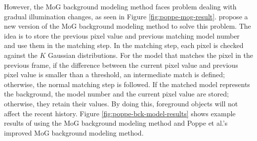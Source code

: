 However, the MoG background modeling method faces problem dealing
with gradual illumination changes, as seen in
Figure \ref{fig:poppe-mog-result}. 
propose a new version of the MoG background modeling method to solve
this problem. The idea is to store the previous pixel value and
previous matching model number and use them in the matching step. In
the matching step, each pixel is checked against the $K$ Gaussian
distributions. For the model that matches the pixel in the previous
frame, if the difference between the current pixel value and previous
pixel value is smaller than a threshold, an intermediate match is
defined; otherwise, the normal matching step is followed. If the
matched model represents the background, the model number and the
current pixel value are stored; otherwise, they retain their
values. By doing this, foreground objects will not affect the recent
history. Figure \ref{fig:poppe-bck-model-results} shows example
results of using the MoG background modeling method and Poppe et al.'s
improved MoG background modeling method.

